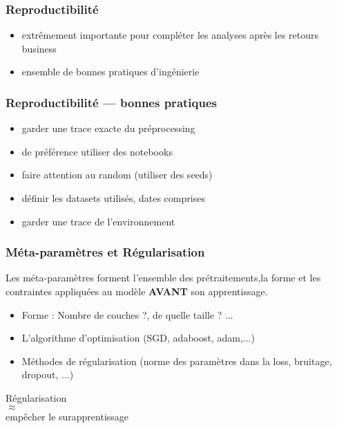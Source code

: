 \begin{frame}
  \frametitle{Reproductibilité}
  \begin{itemize}
  \item extrêmement importante pour compléter les analyses après les retours business
  \item ensemble de bonnes pratiques d'ingénierie
  \end{itemize}
\end{frame}

\begin{frame}
  \frametitle{Reproductibilité — bonnes pratiques}
  \begin{itemize}[<+->]
  \item garder une trace exacte du préprocessing
  \item de préférence utiliser des notebooks
  \item faire attention au random (utiliser des seeds)
  \item définir les datasets utilisés, dates comprises
  \item garder une trace de l'environnement
  \end{itemize}
\end{frame}

\begin{frame}
  \frametitle{Méta-paramètres et Régularisation}
  Les méta-paramètres forment l'ensemble des prétraitements,la forme et les contraintes appliquées au modèle \textbf{AVANT} son apprentissage.
  \begin{itemize}
  \item Forme : Nombre de couches ?, de quelle taille ? ...
  \item L'algorithme d'optimisation (SGD, adaboost, adam,...)
  \item Méthodes de régularisation (norme des paramètres dans la loss, bruitage, dropout, ...)
  \end{itemize}
  \begin{minipage}[l]{0.49\linewidth}
    \begin{center}
      Régularisation \\
      $\approx$\\
      empêcher le surapprentissage
    \end{center}
  \end{minipage}\hfill
  \begin{minipage}[l]{0.49\linewidth}
  \end{minipage}\hfill
\end{frame}

